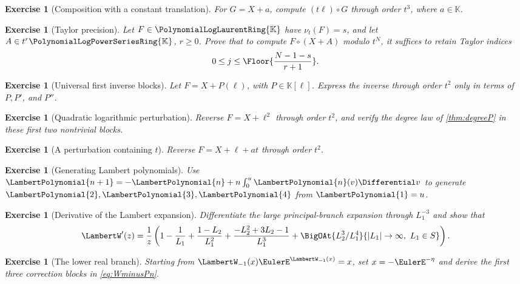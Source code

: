 \documentclass[11pt,oneside,openany]{book}
\newtheorem{exercise}[theorem]{Exercise}
\newcommand{\K}{\mathbb{K}}
\newcommand{\Rring}{\PolynomialLogPowerSeriesRing{\K}}
\newcommand{\Pring}{\PolynomialLogLaurentRing{\K}}
\newcommand{\ordt}{\nu_t}
\newcommand{\compose}{\mathbin{\circ}}
\begin{document}
\begin{exercise}[Composition with a constant translation]
For \(G=X+a\), compute
\((t\ell)\compose G\) through order \(t^3\), where \(a\in\K\).
\end{exercise}

\begin{exercise}[Taylor precision]
Let \(F\in\Pring\) have \(\ordt(F)=s\), and let
\(A\in t^r\Rring\), \(r\geq0\).  Prove that to compute
 \(F\compose(X+A)\) modulo \(t^N\), it suffices to retain Taylor indices
\[
 0\leq j\leq
 \Floor{\frac{N-1-s}{r+1}}.
\]
\end{exercise}

\begin{exercise}[Universal first inverse blocks]
Let \(F=X+P(\ell)\), with \(P\in\K[\ell]\).  Express the inverse through
order \(t^2\) only in terms of \(P,P'\), and \(P''\).
\end{exercise}

\begin{exercise}[Quadratic logarithmic perturbation]
Reverse \(F=X+\ell^2\) through order \(t^2\), and verify the degree law of
\cref{thm:degreeP} in these first two nontrivial blocks.
\end{exercise}

\begin{exercise}[A perturbation containing \(t\)]
Reverse \(F=X+\ell+at\) through order \(t^2\).
\end{exercise}

\begin{exercise}[Generating Lambert polynomials]
Use
\(\LambertPolynomial{n+1}=-\LambertPolynomial{n}+n\int_0^u\LambertPolynomial{n}(v)\Differential v\) to generate \(\LambertPolynomial{2},\LambertPolynomial{3},\LambertPolynomial{4}\) from
\(\LambertPolynomial{1}=u\).
\end{exercise}

\begin{exercise}[Derivative of the Lambert expansion]
Differentiate the large principal-branch expansion through
\(L_1^{-3}\) and show that
\[
 \LambertW'(z)=\frac1z\left(1-\frac1{L_1}
 +\frac{1-L_2}{L_1^2}
 +\frac{-L_2^2+3L_2-1}{L_1^3}
 +\BigOAt{L_2^3/L_1^4}{|L_1|\to\infty,\ L_1\in S}\right).
\]
\end{exercise}

\begin{exercise}[The lower real branch]
Starting from \(\LambertW_{-1}(x)\EulerE^{\LambertW_{-1}(x)}=x\), set
\(x=-\EulerE^{-\eta}\) and derive the first three correction blocks in
\cref{eq:WminusPn}.
\end{exercise}
\end{document}
